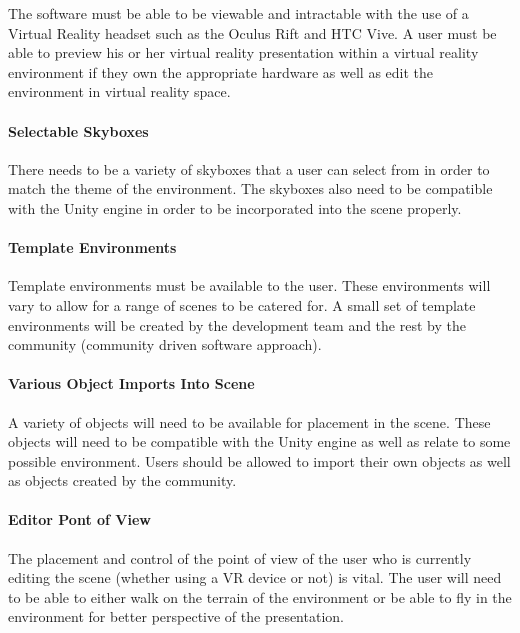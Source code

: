 \documentclass{article}
\begin{document}
		The software must be able to be viewable and intractable with the use of a Virtual Reality headset such as the Oculus Rift and HTC Vive.
		A user must be able to preview his or her virtual reality presentation within a virtual reality environment if they own the appropriate hardware as well as edit the environment in virtual reality space.

		\paragraph{Selectable Skyboxes}

		There needs to be a variety of skyboxes that a user can select from in order to match the theme of the environment.
		The skyboxes also need to be compatible with the Unity engine in order to be incorporated into the scene properly.

		\paragraph{Template Environments}

		Template environments must be available to the user.
		These environments will vary to allow for a range of scenes to be catered for.
		A small set of template environments will be created by the development team and the rest by the community (community driven software approach).

		\paragraph{Various Object Imports Into Scene}

		A variety of objects will need to be available for placement in the scene.
		These objects will need to be compatible with the Unity engine as well as relate to some possible environment.
	  Users should be allowed to import their own objects as well as objects created by the community.

		\paragraph{Editor Pont of View}

		The placement and control of the point of view of the user who is currently editing the scene (whether using a VR device or not) is vital.
		The user will need to be able to either walk on the terrain of the environment or be able to fly in the environment for better perspective of the presentation.
\end{document}
